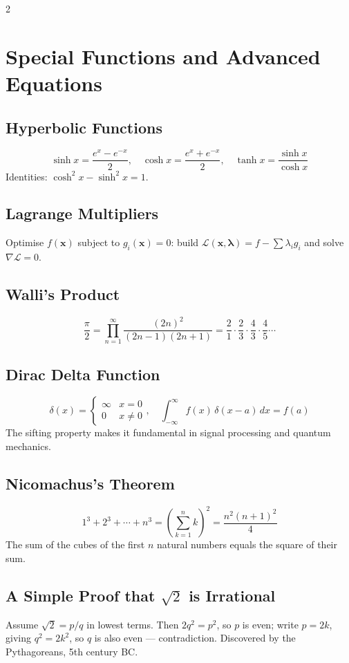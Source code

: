 \documentclass[10pt,a4paper]{article}
\begin{document}
\begin{multicols}{2}
\section{Special Functions and Advanced Equations}

\subsection{Hyperbolic Functions}
\[
\sinh x = \frac{e^x - e^{-x}}{2}, \quad \cosh x = \frac{e^x + e^{-x}}{2}, \quad \tanh x = \frac{\sinh x}{\cosh x}
\]
Identities: $\cosh^2 x - \sinh^2 x = 1$.

\subsection{Lagrange Multipliers}
Optimise $f(\mathbf{x})$ subject to $g_i(\mathbf{x}) = 0$: build $\mathcal{L}(\mathbf{x},\boldsymbol{\lambda}) = f - \sum \lambda_i g_i$ and solve $\nabla\mathcal{L} = 0$.

\subsection{Walli's Product}
\[
\frac{\pi}{2} = \prod_{n=1}^{\infty} \frac{(2n)^2}{(2n-1)(2n+1)} = \frac{2}{1}\cdot\frac{2}{3}\cdot\frac{4}{3}\cdot\frac{4}{5}\cdots
\]

\subsection{Dirac Delta Function}
\[
\delta(x) = \begin{cases}\infty & x=0 \\ 0 & x\neq 0\end{cases}, \quad \int_{-\infty}^{\infty} f(x)\,\delta(x-a)\,dx = f(a)
\]
The sifting property makes it fundamental in signal processing and quantum mechanics.

\subsection{Nicomachus's Theorem}
\[
1^3 + 2^3 + \cdots + n^3 = \left(\sum_{k=1}^n k\right)^2 = \frac{n^2(n+1)^2}{4}
\]
The sum of the cubes of the first $n$ natural numbers equals the square of their sum.

\subsection{A Simple Proof that $\sqrt{2}$ is Irrational}
Assume $\sqrt{2} = p/q$ in lowest terms. Then $2q^2 = p^2$, so $p$ is even; write $p=2k$, giving $q^2 = 2k^2$, so $q$ is also even --- contradiction. Discovered by the Pythagoreans, 5th century BC.


\end{multicols}
\end{document}
